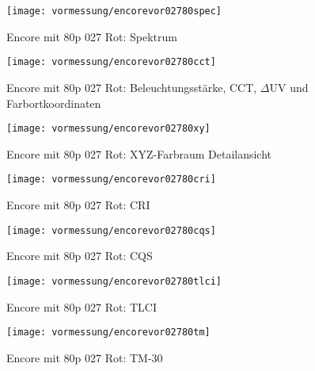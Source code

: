 \documentclass[pagesize,paper=A4,fontsize=12pt,utf8,numbers=noenddot,bibliography=totoc,listof=totoc,DIV=11,BCOR=1mm]{scrreprt}
\begin{document}
\begin{figure}[htp]     %
\centering
\texttt{[image: vormessung/encorevor02780spec]} 
\caption {Encore mit 80p 027 Rot: Spektrum} 
\end{figure}

\begin{figure}[htp]     %
\centering
\texttt{[image: vormessung/encorevor02780cct]} 
\caption {Encore mit 80p 027 Rot: Beleuchtungsstärke, CCT, $\Delta$UV und Farbortkoordinaten} 
\end{figure}

\begin{figure}[htp]     %
\centering
\texttt{[image: vormessung/encorevor02780xy]} 
\caption {Encore mit 80p 027 Rot: XYZ-Farbraum Detailansicht} 
\end{figure}

\begin{figure}[htp]     %
\centering
\texttt{[image: vormessung/encorevor02780cri]} 
\caption {Encore mit 80p 027 Rot: CRI} 
\end{figure}

\begin{figure}[htp]     %
\centering
\texttt{[image: vormessung/encorevor02780cqs]} 
\caption {Encore mit 80p 027 Rot: CQS} 
\end{figure}

\begin{figure}[htp]     %
\centering
\texttt{[image: vormessung/encorevor02780tlci]} 
\caption {Encore mit 80p 027 Rot: TLCI} 
\end{figure}

\begin{figure}[htp]     %
\centering
\texttt{[image: vormessung/encorevor02780tm]} 
\caption {Encore mit 80p 027 Rot: TM-30} 
\end{figure}
\end{document}
